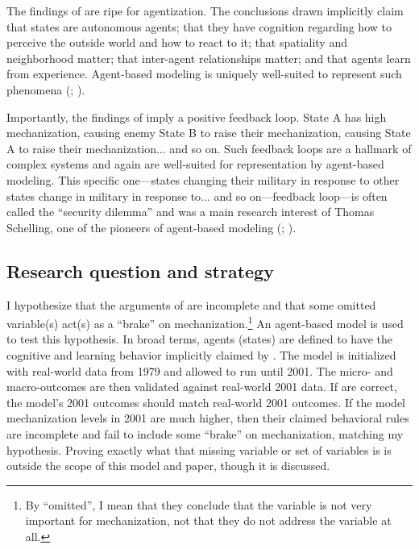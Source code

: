 \documentclass{article}
\begin{document}
The findings of \cite{sechser2010army} are ripe for agentization. The
conclusions drawn implicitly claim
that states are autonomous agents; that they have
cognition regarding how to perceive the outside world
and how to react to it; that spatiality and
neighborhood matter; that inter-agent relationships matter; and that
agents learn from experience. Agent-based modeling is uniquely well-suited to
represent such phenomena (\cite{gilbert2005simulation};
\cite{miller2009complex}).

Importantly, the findings of \cite{sechser2010army} imply a positive feedback
loop. State A has high
mechanization, causing enemy State B to raise their mechanization, causing State
A to raise their mechanization... and so on. Such feedback loops are a hallmark
of complex systems and again are well-suited for representation by agent-based
modeling. This specific one---states changing their military in response to
other states change in military in response to... and so on---feedback loop---is often called
the ``security dilemma'' and was a main research interest of Thomas Schelling, one of the pioneers
of agent-based modeling (\cite{schelling1960strategy};
\cite{schelling2006micromotives}).

\subsection{Research question and strategy}

I hypothesize that the arguments of \cite{sechser2010army} are incomplete and
that some omitted variable(s) act(s) as a ``brake'' on 
mechanization.\footnote{By ``omitted'', I mean that they conclude that the variable
is not very important for mechanization, not that they do not address the
variable at all.} An agent-based model is used to test this hypothesis. In broad
terms, agents (states) are defined to have the cognitive and learning behavior
implicitly claimed by \cite{sechser2010army}. The model is initialized with
real-world data from 1979 and allowed to run until 2001. The micro- and
macro-outcomes are then validated against real-world 2001 data. If
\cite{sechser2010army} are correct, the model's 2001 outcomes should match
real-world 2001 outcomes. If the model mechanization levels in 2001 are much
higher, then their claimed behavioral rules are incomplete and fail to include
some ``brake'' on mechanization, matching my hypothesis. Proving exactly what
that missing variable or set of variables is is outside the scope of this model
and paper, though it is discussed.
\end{document}
